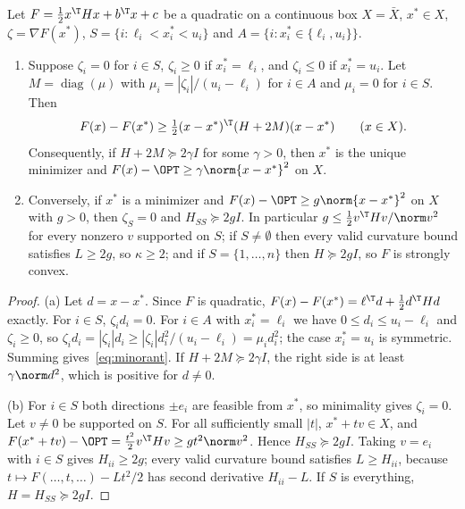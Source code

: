 
\begin{lemma}\label{lem:growthcert}
Let $F=\frac12x^\T Hx+b^\T x+c$ be a quadratic on a continuous box $X=\bar X$, $x^*\in X$, $\zeta=\nabla F(x^*)$,
$S=\{i:\ell_i<x^*_i<u_i\}$ and $A=\{i:x^*_i\in\{\ell_i,u_i\}\}$.
\begin{enumerate}
\item[(a)] Suppose $\zeta_i=0$ for $i\in S$, $\zeta_i\ge0$ if $x_i^*=\ell_i$, and
$\zeta_i\le0$ if $x^*_i=u_i$. Let $M=\operatorname{diag}(\mu)$ with
$\mu_i=|\zeta_i|/(u_i-\ell_i)$ for $i\in A$ and $\mu_i=0$ for $i\in S$. Then
\begin{equation}\label{eq:minorant}
F(x)-F(x^*)\ge\tfrac12(x-x^*)^{\T}(H+2M)(x-x^*)\qquad(x\in X).
\end{equation}
Consequently, if $H+2M\succeq2\gamma I$ for some $\gamma>0$, then $x^*$ is the
unique minimizer and $F(x)-\OPT\ge\gamma\norm{x-x^*}^2$ on $X$.
\item[(b)] Conversely, if $x^*$ is a minimizer and
$F(x)-\OPT\ge g\norm{x-x^*}^2$ on $X$ with $g>0$, then $\zeta_S=0$ and
$H_{SS}\succeq2gI$. In particular $g\le\frac12v^{\T}Hv/\norm v^2$ for
every nonzero $v$ supported on $S$; if $S\ne\emptyset$ then every valid
curvature bound satisfies $L\ge2g$, so $\kappa\ge2$; and if $S=\{1,\dots,n\}$
then $H\succeq2gI$, so $F$ is strongly convex.
\end{enumerate}
\end{lemma}

\begin{proof}
(a) Let $d=x-x^*$. Since $F$ is quadratic,
$F(x)-F(x^*)=\ell^{\T}d+\frac12d^{\T}Hd$ exactly. For $i\in S$,
$\zeta_id_i=0$. For $i\in A$ with $x_i^*=\ell_i$ we have $0\le d_i\le u_i-\ell_i$
and $\zeta_i\ge0$, so $\zeta_id_i=|\zeta_i|d_i\ge|\zeta_i|d_i^2/(u_i-\ell_i)=\mu_id_i^2$;
the case $x_i^*=u_i$ is symmetric. Summing gives~\eqref{eq:minorant}. If
$H+2M\succeq2\gamma I$, the right side is at least $\gamma\norm d^2$, which is
positive for $d\ne0$.

(b) For $i\in S$ both directions $\pm e_i$ are feasible from $x^*$, so
minimality gives $\zeta_i=0$. Let $v\ne0$ be supported on $S$. For all
sufficiently small $|t|$, $x^*+tv\in X$, and
$F(x^*+tv)-\OPT=\frac{t^2}2v^{\T}Hv\ge gt^2\norm v^2$. Hence
$H_{SS}\succeq2gI$. Taking $v=e_i$ with $i\in S$ gives $H_{ii}\ge2g$; every
valid curvature bound satisfies $L\ge H_{ii}$, because
$t\mapsto F(\dots,t,\dots)-Lt^2/2$ has second derivative $H_{ii}-L$. If
$S$ is everything, $H=H_{SS}\succeq2gI$.
\end{proof}

